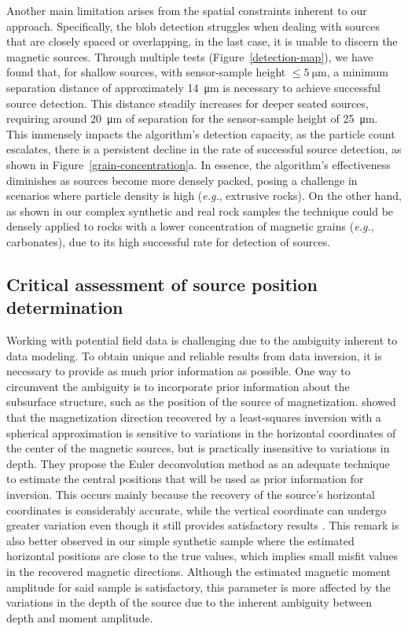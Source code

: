 Another main limitation arises from the spatial constraints inherent to our approach. Specifically, the blob detection struggles when dealing with sources that are closely spaced or overlapping, in the last case, it is unable to discern the magnetic sources. Through multiple tests (Figure~\ref{detection-map}), we have found that, for shallow sources, with sensor-sample height $\leq \qty{5}{\um}$, a minimum separation distance of approximately \qty{14}{\um} is necessary to achieve successful source detection. This distance steadily increases for deeper seated sources, requiring around \qty{20}{\um} of separation for the sensor-sample height of \qty{25}{\um}. This immensely impacts the algorithm's detection capacity, as the particle count escalates, there is a persistent decline in the rate of successful source detection, as shown in Figure~\ref{grain-concentration}a. In essence, the algorithm's effectiveness diminishes as sources become more densely packed, posing a challenge in scenarios where particle density is high (\textit{e.g.}, extrusive rocks). On the other hand, as shown in our complex synthetic and real rock samples the technique could be densely applied to rocks with a lower concentration of magnetic grains (\textit{e.g.}, carbonates), due to its high successful rate for detection of sources.


\subsection{Critical assessment of source position determination}

Working with potential field data is challenging due to the ambiguity inherent to data modeling. To obtain unique and reliable results from data inversion, it is necessary to provide as much prior information as possible.
One way to circumvent the ambiguity is to incorporate prior information about the subsurface structure, such as the position of the source of magnetization.
\citet{Oliveira2015Estimation} showed that the magnetization direction recovered by a least-squares inversion with a spherical approximation is sensitive to variations in the horizontal coordinates of the center of the magnetic sources, but is practically insensitive to variations in depth.
They propose the Euler deconvolution method as an adequate technique to estimate the central positions that will be used as prior information for inversion.
This occurs mainly because the recovery of the source's horizontal coordinates is considerably accurate, while the vertical coordinate can undergo greater variation even though it still provides satisfactory results \citep{Silva20033D, Melo2013}.
This remark is also better observed in our simple synthetic sample where the estimated horizontal positions are close to the true values, which implies small misfit values in the recovered magnetic directions.
Although the estimated magnetic moment amplitude for said sample is satisfactory, this parameter is more affected by the variations in the depth of the source due to the inherent ambiguity between depth and moment amplitude.


